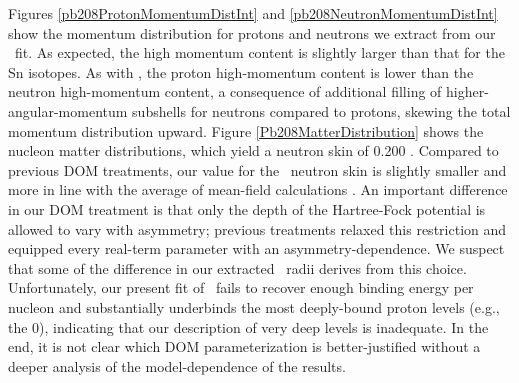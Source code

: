 Figures \ref{pb208ProtonMomentumDistInt} and \ref{pb208NeutronMomentumDistInt} show the momentum 
distribution for protons and neutrons we extract from
our \pbEight\ fit. As expected, the high momentum content is slightly larger than that for the Sn
isotopes. As with \caEight, the proton high-momentum content is lower than the
neutron high-momentum content, a consequence of additional filling of
higher-angular-momentum subshells for neutrons compared to protons, skewing the
total momentum distribution upward.
Figure \ref{Pb208MatterDistribution} shows the nucleon matter distributions, which yield a
neutron skin of 0.200 \femto\meter. Compared to
previous DOM treatments, our value for the
\pbEight\ neutron skin is slightly smaller and more in line with the average of mean-field
calculations \cite{Fattoyev2012}. An important difference in our DOM treatment is that only the
depth of the Hartree-Fock potential is allowed to vary with asymmetry; previous treatments
relaxed this restriction and equipped every real-term parameter with an asymmetry-dependence. We
suspect that some of the difference in our extracted \pbEight\ radii derives
from this choice. Unfortunately, our present fit of \pbEight\ fails to recover
enough binding energy per nucleon and substantially underbinds the most deeply-bound proton
levels (e.g., the 0\pThree), indicating that our description of very deep levels
is inadequate. In the end, it is not clear which DOM parameterization
is better-justified without a deeper analysis of the model-dependence of the results.
